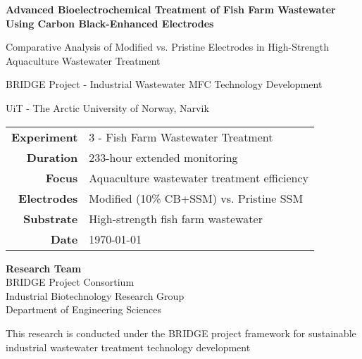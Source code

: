 \documentclass[12pt,a4paper]{article}
\begin{document}
\begin{titlepage}
    \centering
    \vspace*{2cm}
    
    {\huge\bfseries Advanced Bioelectrochemical Treatment of Fish Farm Wastewater Using Carbon Black-Enhanced Electrodes\par}
    
    \vspace{1cm}
    {\Large Comparative Analysis of Modified vs. Pristine Electrodes in High-Strength Aquaculture Wastewater Treatment\par}
    
    \vspace{1.5cm}
    {\large BRIDGE Project - Industrial Wastewater MFC Technology Development\par}
    
    \vspace{0.5cm}
    {\large UiT - The Arctic University of Norway, Narvik\par}
    
    \vspace{2cm}
    
    \begin{tabular}{rl}
        \textbf{Experiment} & 3 - Fish Farm Wastewater Treatment \\
        \textbf{Duration} & 233-hour extended monitoring \\
        \textbf{Focus} & Aquaculture wastewater treatment efficiency \\
        \textbf{Electrodes} & Modified (10\% CB+SSM) vs. Pristine SSM \\
        \textbf{Substrate} & High-strength fish farm wastewater \\
        \textbf{Date} & \today \\
    \end{tabular}
    
    \vspace{2cm}
    
    {\large \textbf{Research Team}}\\
    \vspace{0.5cm}
    BRIDGE Project Consortium\\
    Industrial Biotechnology Research Group\\
    Department of Engineering Sciences\\
    
    \vfill
    
    {\footnotesize This research is conducted under the BRIDGE project framework for sustainable industrial wastewater treatment technology development}
    
\end{titlepage}
\end{document}
